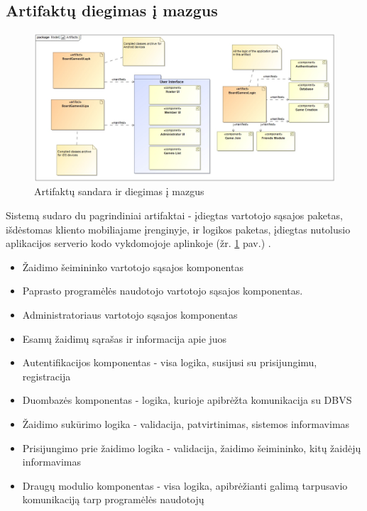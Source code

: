\documentclass{VUMIFPSkursinis}
\begin{document}
	\subsection{Artifaktų diegimas į mazgus}
				\begin{figure}[H]
				\centering
				\includegraphics[scale=0.4]{img/Artifacts}
				\caption{Artifaktų sandara ir diegimas į mazgus}
				\label{img:Artifacts}
			\end{figure}
			Sistemą sudaro du pagrindiniai artifaktai - įdiegtas vartotojo sąsajos 				paketas, išdėstomas kliento mobiliajame įrenginyje, ir logikos paketas, 			įdiegtas nutolusio aplikacijos serverio kodo vykdomojoje aplinkoje (žr. \ref{img:Artifacts} pav.) . 
  				\begin{itemize}
					\item Žaidimo šeimininko vartotojo sąsajos komponentas
					\item Paprasto programėlės naudotojo vartotojo sąsajos komponentas.
					\item Administratoriaus vartotojo sąsajos komponentas
					\item Esamų žaidimų sąrašas ir informacija apie juos
				\end{itemize}
  				\begin{itemize}
					\item Autentifikacijos komponentas - visa logika, susijusi 						su prisijungimu, registracija 
					\item Duombazės komponentas - logika, kurioje apibrėžta 					komunikacija su DBVS
					\item Žaidimo sukūrimo logika - validacija, patvirtinimas, 
					sistemos informavimas
					\item Prisijungimo prie žaidimo logika - validacija, 						žaidimo šeimininko, kitų žaidėjų informavimas 
					\item Draugų modulio komponentas - visa logika, 					apibrėžianti galimą tarpusavio komunikaciją tarp 						programėlės naudotojų
				\end{itemize}
\end{document}
